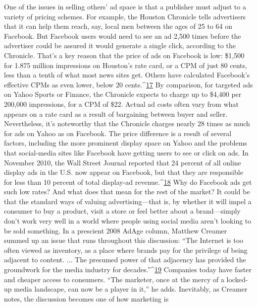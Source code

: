 One of the issues in selling others’ ad space is that a publisher must adjust to a
variety of pricing schemes. For example, the Houston Chronicle tells advertisers
that it can help them reach, say, local men between the ages of 25 to 64 on
Facebook. But Facebook users would need to see an ad 2,500 times before the
advertiser could be assured it would generate a single click, according to the
Chronicle. That’s a key reason that the price of ads on Facebook is low: \$1,500
for 1.875 million impressions on Houston’s rate card, or a CPM of just 80 cents,
less than a tenth of what most news sites get. Others have calculated Facebook’s
effective CPMs as even lower, below 20 cents.^{\href{#endnotes-ch8}{17}} By comparison, for targeted ads
on Yahoo Sports or Finance, the Chronicle expects to charge up to \$4,400 per
200,000 impressions, for a CPM of \$22.
Actual ad costs often vary from what appears on a rate card as a result of bargaining
between buyer and seller. Nevertheless, it’s noteworthy that the Chronicle
charges nearly 28 times as much for ads on Yahoo as on Facebook. The price difference
is a result of several factors, including the more prominent display space
on Yahoo and the problems that social-media sites like Facebook have getting
users to see or click on ads. In November 2010, the Wall Street Journal reported
that 24 percent of all online display ads in the U.S. now appear on Facebook, but
that they are responsible for less than 10 percent of total display-ad revenue.^{\href{#endnotes-ch8}{18}}
Why do Facebook ads get such low rates? And what does that mean for the rest
of the market? It could be that the standard ways of valuing advertising—that is,
by whether it will impel a consumer to buy a product, visit a store or feel better
about a brand—simply don’t work very well in a world where people using
social media aren’t looking to be sold something.
In a prescient 2008 AdAge column, Matthew Creamer summed up an issue
that runs throughout this discussion: ``The Internet is too often viewed as inventory,
as a place where brands pay for the privilege of being adjacent to content.
... The presumed power of that adjacency has provided the groundwork for the
media industry for decades.''^{\href{#endnotes-ch8}{19}} Companies today have faster and cheaper access
to consumers. ``The marketer, once at the mercy of a locked-up media landscape,
can now be a player in it,'' he adds.
Inevitably, as Creamer notes, the discussion becomes one of how marketing is
